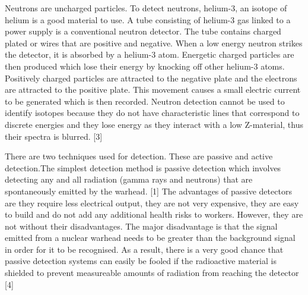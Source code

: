 \documentclass[twocolumn,a4paper]{article}
\begin{document}
Neutrons are uncharged particles. To detect neutrons, helium-3, an isotope of helium is a
good material to use. A tube consisting of helium-3 gas linked to a power supply is a
conventional neutron detector. The tube contains charged plated or wires that are positive and
negative. When a low energy neutron strikes the detector, it is absorbed by a helium-3 atom.
Energetic charged particles are then produced which lose their energy by knocking off other
helium-3 atoms. Positively charged particles are attracted to the negative plate and the electrons
are attracted to the positive plate. This movement causes a small electric current to be generated
which is then recorded. Neutron detection cannot be used to identify isotopes because they do
not have characteristic lines that correspond to discrete energies and they lose energy as they
interact with a low Z-material, thus their spectra is blurred. [3]

There are two techniques used for detection. These are passive and active detection.The
simplest detection method is passive detection which involves detecting any and all radiation
(gamma rays and neutrons) that are spontaneously emitted by the warhead. [1] The advantages of
passive detectors are they require less electrical output, they are not very expensive, they are
easy to build and do not add any additional health risks to workers. However, they are not
without their disadvantages. The major disadvantage is that the signal emitted from a nuclear
warhead needs to be greater than the background signal in order for it to be recognised. As a
result, there is a very good chance that passive detection systems can easily be fooled if the
radioactive material is shielded to prevent measureable amounts of radiation from reaching the
detector [4]
\end{document}
